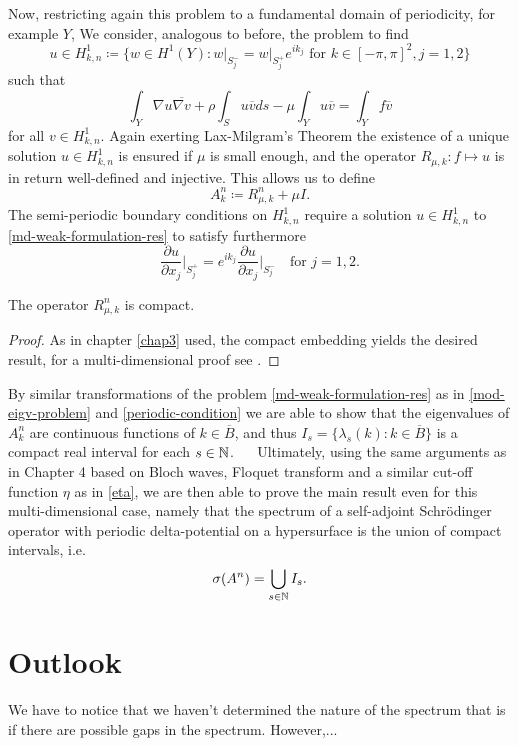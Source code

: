 Now, restricting again this problem to a fundamental domain of periodicity, for example $Y$,
We consider, analogous to before, the problem to find 
	\[ u \in H^{1}_{k, n} \coloneqq \big\{ w \in H^{1}(Y) \colon w \big|_{S_{j}^{-}} = w \big|_{S_{j}^{+}} e^{i k_{j}} \text{ for } k \in [-\pi, \pi]^{2}, j = 1,2 \big\} \]
such that
	\begin{equation}
		\int_{Y} \nabla u \overline{\nabla v} + \rho \int_{S} u \overline{v} ds - \mu \int_{Y} u \overline{v} = \int_{Y} f \overline{v} \label{md-weak-formulation-res}
	\end{equation} 
for all $v \in H^{1}_{k, n}$. 
Again exerting Lax-Milgram's Theorem the existence of a unique solution $u \in H^{1}_{k, n}$ is ensured if $\mu$ is small enough, and the operator $R_{\mu, k} \colon f \mapsto u$ is in return well-defined and injective. This allows us to define 
	\[ A_{k}^{n} \coloneqq R_{\mu, k}^{n} + \mu I. \]
The semi-periodic boundary conditions on $H^{1}_{k,n}$ require a solution $u \in H^{1}_{k, n}$ to \eqref{md-weak-formulation-res} to satisfy furthermore
	\[ \frac{\partial u}{\partial x_{j}}\big|_{S_{j}^{+}} = e^{ik_{j}} \frac{\partial u}{\partial x_{j}}\big|_{S_{j}^{-}} \quad \text{for } j = 1, 2.  \] %
	
\begin{theorem}
	The operator $R_{\mu, k}^{n}$ is compact.	

	\begin{proof}
		As in chapter \ref{chap3} used, the compact embedding yields the desired result, for a multi-dimensional proof see \cite[Chap. 4]{Adams}.	
	\end{proof}
\end{theorem}

By similar transformations of the problem \eqref{md-weak-formulation-res} as in \eqref{mod-eigv-problem} and \eqref{periodic-condition} we are able to show that the eigenvalues of $A^{n}_{k}$ are continuous functions of $k \in \overline{B}$, and thus $I_{s} = \{ \lambda_{s}(k) : k \in \overline{B} \}$ is a compact real interval for each $s \in \mathbb{N}$. %
~\newline ~\newline
Ultimately, using the same arguments as in Chapter 4 based on Bloch waves, Floquet transform and a similar cut-off function $\eta$ as in \eqref{eta}, we are then able to prove the main result even for this multi-dimensional case, namely that the spectrum of a self-adjoint Schrödinger operator with periodic delta-potential on a hypersurface is the union of compact intervals, i.e.
	\[ \sigma(A^{n}) = \bigcup_{s \in \mathbb{N}} I_{s}. \]

\section{Outlook}	
	
We have to notice that we haven't determined the nature of the spectrum that is if there are possible gaps in the spectrum. However,... %